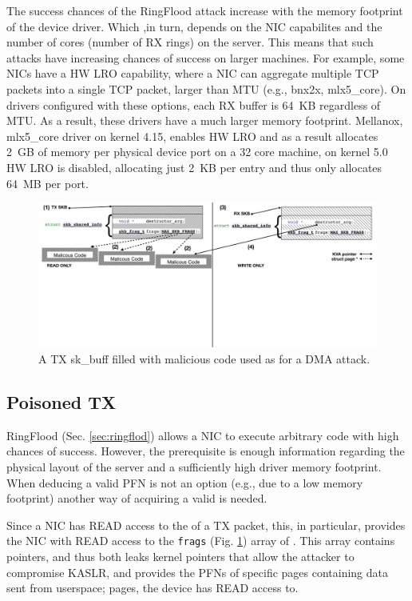 The success chances of the RingFlood attack increase with the memory footprint of the device driver. Which ,in turn, depends on the NIC capabilites and the number of cores (number of RX rings) on the server. This means that such attacks have increasing chances of success on larger machines. 
For example, some NICs have a HW LRO capability\cite{mlx5_lro}, where a NIC can aggregate multiple TCP packets into a single TCP packet, larger than MTU (e.g., bnx2x, mlx5\_core). On drivers configured with these options, each RX buffer is 64~KB regardless of MTU. As a result, these drivers have a much larger memory footprint. Mellanox, mlx5\_core driver on kernel 4.15, enables HW LRO and as a result allocates 2~GB of memory per physical device port on a 32 core machine, on kernel 5.0 HW LRO is disabled, allocating just 2~KB per entry and thus only allocates 64~MB per port.

\begin{figure}[t]
    \centering
    \includegraphics[width=\linewidth]{figs/accomplice.pdf}
    \caption{A TX sk\_buff filled with malicious code used as \means{} for a DMA attack.}
    \label{fig:payload}
\end{figure}
\subsection{Poisoned TX}\label{sec:posion}

RingFlood (Sec. \ref{sec:ringflod}) allows a NIC to execute arbitrary code with high chances of success. However, the prerequisite is enough information regarding the physical layout of the server and a sufficiently high driver memory footprint. When deducing a valid PFN is not an option (e.g., due to a low memory footprint) another way of acquiring a valid \kva{} is needed.

Since a NIC has READ access to the \shinfo{} of a TX packet, this, in particular, provides the NIC with READ access to the \texttt{frags} (Fig. \ref{fig:payload}) array of \shinfo{}. This array contains \page{} pointers, and thus both leaks kernel pointers that allow the attacker to compromise KASLR, and provides the PFNs of specific pages containing data sent from userspace; pages, the device has READ access to.

